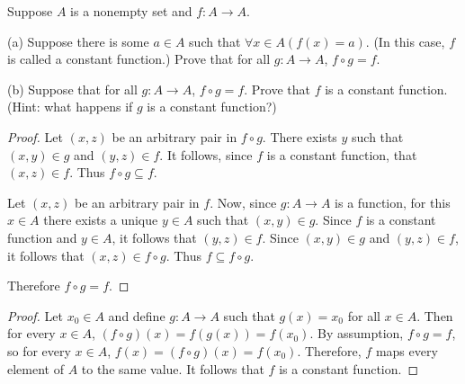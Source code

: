 \newpage
\begin{tcolorbox}[title=Problem 17, breakable]
    Suppose $A$ is a nonempty set and $f : A \rightarrow A$.

    (a) Suppose there is some $a \in A$ such that 
        $\forall{x} \in A(f(x) = a)$. (In this case, $f$ is called 
        a constant function.) Prove that for all $g : A \rightarrow A$,
        $f \circ g  = f$.

    (b) Suppose that for all $g : A \rightarrow A$, $f \circ g = f$.
        Prove that $f$ is a constant function. (Hint: what happens
        if $g$ is a constant function?)
\end{tcolorbox}

\begin{proof}
    Let $(x, z)$ be an arbitrary pair in $f \circ g$.
    There exists $y$ such that $(x, y) \in g$ and $(y, z) \in f$.
    It follows, since $f$ is a constant function, that $(x, z) \in f$.
    Thus $f \circ g \subseteq f$.

    Let $(x, z)$ be an arbitrary pair in $f$.
    Now, since $g : A \rightarrow A$ is a function, for this $x \in A$
        there exists a unique $y \in A$ such that $(x, y) \in g$.
    Since $f$ is a constant function and $y \in A$,
        it follows that $(y, z) \in f$.
    Since $(x, y) \in g$ and $(y, z) \in f$, 
        it follows that $(x, z) \in f \circ g$.
    Thus $f \subseteq f \circ g$.

    Therefore $f \circ g = f$.
\end{proof}

\begin{proof}
    Let $x_0 \in A$ and define 
        $g : A \to A$ such that $g(x) = x_0$ for all $x \in A$.
    Then for every $x \in A$, $(f \circ g)(x) = f(g(x)) = f(x_0)$.
    By assumption, $f \circ g = f$, so for every $x \in A$, $f(x) = (f \circ g)(x) = f(x_0)$.
    Therefore, $f$ maps every element of $A$ to the same value.
    It follows that $f$ is a constant function.
\end{proof}

